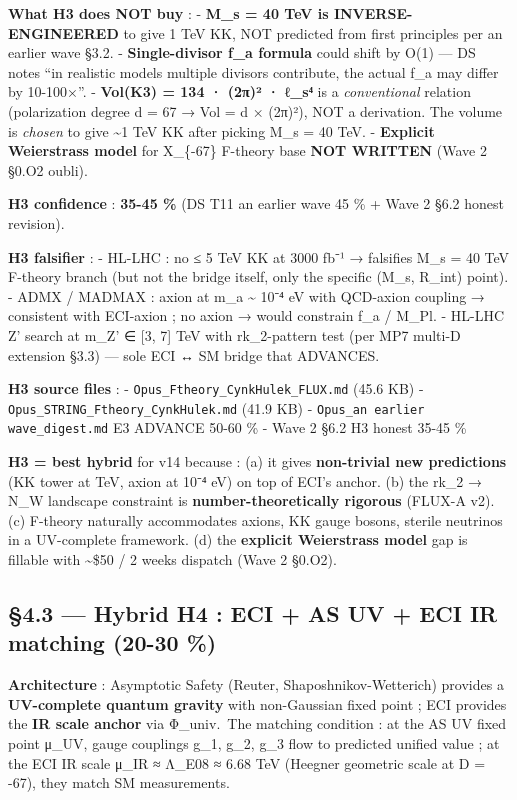 \documentclass[
  11pt,
  a4paper,
]{article}
\begin{document}
\textbf{What H3 does NOT buy} :
- \textbf{M\_s = 40 TeV is INVERSE-ENGINEERED} to give 1 TeV KK, NOT predicted from first principles per an earlier wave §3.2.
- \textbf{Single-divisor f\_a formula} could shift by O(1) --- DS notes ``in realistic models multiple divisors contribute, the actual f\_a may differ by 10-100×''.
- \textbf{Vol(K3) = 134 · (2π)² · ℓ\_s⁴} is a \emph{conventional} relation (polarization degree d = 67 → Vol = d × (2π)²), NOT a derivation. The volume is \emph{chosen} to give \textasciitilde1 TeV KK after picking M\_s = 40 TeV.
- \textbf{Explicit Weierstrass model} for X\_\{-67\} F-theory base \textbf{NOT WRITTEN} (Wave 2 §0.O2 oubli).

\textbf{H3 confidence} : \textbf{35-45 \%} (DS T11 an earlier wave 45 \% + Wave 2 §6.2 honest revision).

\textbf{H3 falsifier} :
- HL-LHC : no ≤ 5 TeV KK at 3000 fb⁻¹ → falsifies M\_s = 40 TeV F-theory branch (but not the bridge itself, only the specific (M\_s, R\_int) point).
- ADMX / MADMAX : axion at m\_a \textasciitilde{} 10⁻⁴ eV with QCD-axion coupling → consistent with ECI-axion ; no axion → would constrain f\_a / M\_Pl.
- HL-LHC Z' search at m\_Z' ∈ {[}3, 7{]} TeV with rk\_2-pattern test (per MP7 multi-D extension §3.3) --- sole ECI ↔ SM bridge that ADVANCES.

\textbf{H3 source files} :
- \texttt{Opus\_Ftheory\_CynkHulek\_FLUX.md} (45.6 KB)
- \texttt{Opus\_STRING\_Ftheory\_CynkHulek.md} (41.9 KB)
- \texttt{Opus\_an earlier wave\_digest.md} E3 ADVANCE 50-60 \%
- Wave 2 §6.2 H3 honest 35-45 \%

\textbf{H3 = best hybrid} for v14 because :
(a) it gives \textbf{non-trivial new predictions} (KK tower at TeV, axion at 10⁻⁴ eV) on top of ECI's anchor.
(b) the rk\_2 → N\_W landscape constraint is \textbf{number-theoretically rigorous} (FLUX-A v2).
(c) F-theory naturally accommodates axions, KK gauge bosons, sterile neutrinos in a UV-complete framework.
(d) the \textbf{explicit Weierstrass model} gap is fillable with \textasciitilde\$50 / 2 weeks dispatch (Wave 2 §0.O2).

\hypertarget{hybrid-h4-eci-as-uv-eci-ir-matching-20-30}{%
\subsection{§4.3 --- Hybrid H4 : ECI + AS UV + ECI IR matching (20-30 \%)}\label{hybrid-h4-eci-as-uv-eci-ir-matching-20-30}}

\textbf{Architecture} : Asymptotic Safety (Reuter, Shaposhnikov-Wetterich) provides a \textbf{UV-complete quantum gravity} with non-Gaussian fixed point ; ECI provides the \textbf{IR scale anchor} via Φ\_univ.~The matching condition : at the AS UV fixed point μ\_UV, gauge couplings g\_1, g\_2, g\_3 flow to predicted unified value ; at the ECI IR scale μ\_IR ≈ Λ\_E08 ≈ 6.68 TeV (Heegner geometric scale at D = -67), they match SM measurements.
\end{document}
